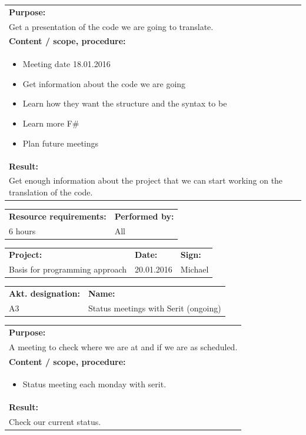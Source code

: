 \documentclass[12pt, a4paper]{article}
\begin{document}
\begin{tabularx}{\textwidth}{|X|}
	\textbf{Purpose:}\\
	Get a presentation of the code we are going to translate.\\
	\hline
	\textbf{Content / scope, procedure:}\\
	\begin{itemize}[noitemsep,topsep=0pt]
		\item Meeting date 18.01.2016
		\item Get information about the code we are going 			\item Learn how they want the structure and the syntax to be
		\item Learn more F\#
		\item Plan future meetings

	\end{itemize}\\
 	\hline
	\textbf{Result:}\\
	Get enough information about the project that we can start working on the translation of the code.\\
	\hline
\end{tabularx}

\begin{tabularx}{\textwidth}{|X|p{30mm}|}
	\textbf{Resource requirements:}&\textbf{Performed by:}\\
	 6 hours&All\\
	\hline
\end{tabularx}

\newpage

\begin{tabularx}{\textwidth}{|X|p{32mm}|p{20mm}|}
	\hline
	\textbf{Project:}&\textbf{Date:}&\textbf{Sign:}\\
	Basis for programming approach&20.01.2016&Michael\\
	\hline
\end{tabularx}

\begin{tabularx}{\textwidth}{|p{40mm}|X|}
	\textbf{Akt. designation:}&\textbf{Name:}\\
	A3&Status meetings with Serit (ongoing)\\
	\hline
\end{tabularx}

\begin{tabularx}{\textwidth}{|X|}
	\textbf{Purpose:}\\
	A meeting to check where we are at and if we are as scheduled.\\
	\hline
	\textbf{Content / scope, procedure:}\\
	\begin{itemize}[noitemsep,topsep=0pt]
		\item Status meeting each monday with serit.
	\end{itemize}\\
 	\hline
	\textbf{Result:}\\
	Check our current status.\\
	\hline
\end{tabularx}
\end{document}
